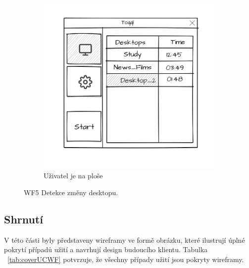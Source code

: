 \documentclass[thesis=B,czech]{FITthesis}[2012/06/26]
\begin{document}
\begin{figure}[h]
\begin{subfigure}[h]{0.53\linewidth}
		\includegraphics[width=\linewidth]{wf_det.png}
		\caption{Uživatel je na ploše }
	\end{subfigure}
	\caption{WF5 Detekce změny desktopu.}\label{fig:wf_det}
\end{figure}

\subsection{Shrnutí}

V této části byly představeny wireframy ve formě obrázku, které ilustrují úplné pokrytí případů užití a navrhují design budoucího klientu. Tabulka ~\ref{tab:coverUCWF} potvrzuje, že všechny případy užití jsou pokryty wireframy. 

\clearpage
\end{document}
